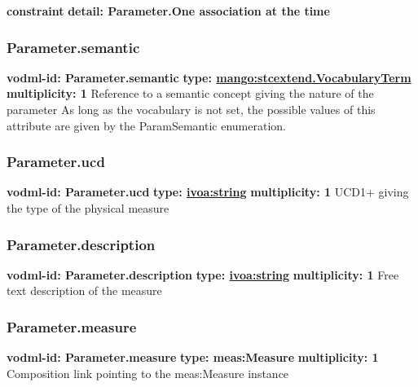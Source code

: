     \noindent \textbf{constraint} \newline
    \indent    \textbf{detail: Parameter.One association at the time
 }\newline


    \subsubsection{Parameter.semantic}
      \textbf{vodml-id: Parameter.semantic} \newline
      \textbf{type: \hyperref[sect:stcextend.VocabularyTerm]{mango:stcextend.VocabularyTerm}} \newline
      \textbf{multiplicity: 1} \newline 
      Reference to a semantic concept giving the nature of the parameter As long as the vocabulary is not set, the possible values of this attribute are given by the ParamSemantic enumeration.

    \subsubsection{Parameter.ucd}
      \textbf{vodml-id: Parameter.ucd} \newline
      \textbf{type: \hyperref[sect:ivoa]{ivoa:string}} \newline
      \textbf{multiplicity: 1} \newline 
      UCD1+ giving the type of the physical measure

    \subsubsection{Parameter.description}
      \textbf{vodml-id: Parameter.description} \newline
      \textbf{type: \hyperref[sect:ivoa]{ivoa:string}} \newline
      \textbf{multiplicity: 1} \newline 
      Free text description of the measure

    \subsubsection{Parameter.measure}
      \textbf{vodml-id: Parameter.measure} \newline
      \textbf{type: meas:Measure} \newline
      \textbf{multiplicity: 1} \newline 
      Composition link pointing to the meas:Measure instance

